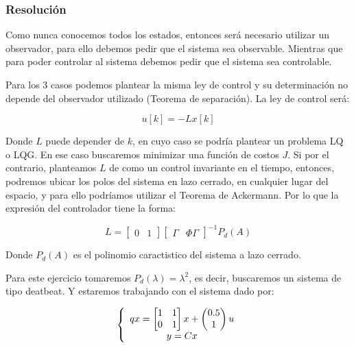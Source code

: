 \subsubsection*{Resolución}

Como nunca conocemos todos los estados, entonces será necesario utilizar un observador, 
para ello debemos pedir que el sistema sea observable. Mientras que para poder controlar 
al sistema debemos pedir que el sistema sea controlable.

Para los 3 casos podemos plantear la misma ley de control y su determinación no depende 
del observador utilizado (Teorema de separación). La ley de control será:

\begin{equation}
    u[k] = -Lx[k]
\end{equation}

Donde $L$ puede depender de $k$, en cuyo caso se podría plantear un problema LQ o LQG. 
En ese caso buscaremos minimizar una función de costos $J$. Si por el contrario, planteamos 
$L$ de como un control invariante en el tiempo, entonces, podremos ubicar los polos 
del sistema en lazo cerrado, en cualquier lugar del espacio, y para ello podríamos utilizar 
el Teorema de Ackermann. Por lo que la expresión del controlador tiene la forma: 

\begin{equation}
    L = 
    \begin{bmatrix}
        0 & 1
    \end{bmatrix} 
    \begin{bmatrix}
        \Gamma & \Phi\Gamma
    \end{bmatrix}^{-1} P_d(A)   
\end{equation}

Donde $P_d(A)$ es el polinomio caractistico del sistema a lazo cerrado.

Para este ejercicio tomaremos $P_d(\lambda)=\lambda^2$, es decir, buscaremos un 
sistema de tipo deatbeat. Y estaremos trabajando con el sistema dado por: 

\begin{equation}
    \left\{ \begin{array}{c} 
        qx = \begin{bmatrix}
            1 & 1 \\ 
            0 & 1
        \end{bmatrix}x 
        + 
        \begin{pmatrix}
            0.5 \\ 1
        \end{pmatrix}u  \\ 
        y = Cx
     \end{array} \right.
\end{equation}

